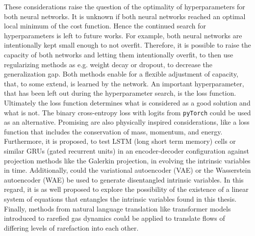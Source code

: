 These considerations raise the question of the optimality of hyperparameters for both neural networks. It is unknown if both neural networks reached an optimal local minimum of the cost function. Hence the continued search for hyperparameters is left to future works. For example, both neural networks are intentionally kept small enough to not overfit. Therefore, it is possible to raise the capacity of both networks and letting them intentionally overfit, to then use regularizing methods as e.g. weight decay or dropout, to decrease the generalization gap. Both methods enable for a flexible adjustment of capacity, that, to some extend, is learned by the network. An important hyperparameter, that has been left out during the hyperparameter search, is the loss function. Ultimately the loss function determines what is considered as a good solution and what is not. The binary cross-entropy loss with logits from \texttt{pyTorch} could be used as an alternative. Promising are also physically inspired considerations, like a loss function that includes the conservation of mass, momentum, and energy.\\
Furthermore, it is proposed, to test LSTM (long short term memory) cells or similar GRUs (gated recurrent units) in an encoder-decoder configuration against projection methods like the Galerkin projection, in evolving the intrinsic variables in time. Additionally, could the variational autoencoder (VAE) or the Wasserstein autoencoder (WAE) be used to generate disentangled intrinsic variables. In this regard, it is as well proposed to explore the possibility of the existence of a linear system of equations that entangles the intrinsic variables found in this thesis. 
Finally, methods from natural language translation like transformer models introduced to rarefied gas dynamics could be applied to translate flows of differing levels of rarefaction into each other.
 